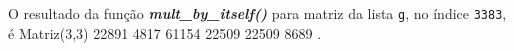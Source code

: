 \documentclass[12pt,varwidth=16cm,border=1pt]{standalone}
\begin{document}
O resultado da função \textbf{\textit{mult\_by\_itself()}} para matriz da lista \verb+g+, no índice \verb+3383+, é \newline Matriz(3,3)
  22891 4817 
  61154 22509 
  22509 8689 .

\questiomtrue
\end{document}
